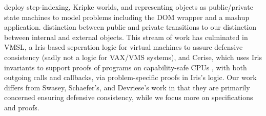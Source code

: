 




 
\citet{dd} deploy
step-indexing, Kripke worlds, and representing objects
as public/private state machines%
to model 
problems including the 
DOM wrapper and a mashup application.
 distinction
between public and private transitions %
 to our
distinction between internal and external objects.
%
%
This stream of work has culminated in VMSL, a Iris-based seperation logic for
virtual machines to assure defensive consistency
\cite{vmsl-pldi2023}
(sadly not a logic for VAX/VMS systems),
%
%
and Cerise, which
uses Iris invariants to support proofs of programs
on capability-safe CPUs \cite{cerise-jacm2024},
with both  
outgoing calls and callbacks, via
problem-specific proofs in Iris's logic.
%
Our work differs from Swasey, Schaefer's, and Devriese's work in that
they are primarily concerned  %
ensuring defensive consistency, 
while we focus more on specifications%
and proofs.%
%
%
%
%



